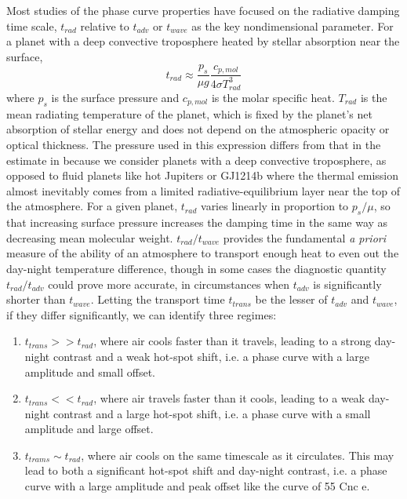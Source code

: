 Most studies of the phase curve properties have focused on the radiative damping time scale, $t_{rad}$ relative to $t_{adv}$ or $t_{wave}$ as the key nondimensional parameter.
For a planet with a deep convective troposphere heated by stellar absorption near the surface,
\begin{equation}
t_{rad} \approx \frac{p_{s}}{\mu g}  \frac{c_{p,mol}}{4 \sigma T_{rad}^3}
\end{equation}
where $p_s$ is the surface pressure and $c_{p,mol}$ is the molar specific heat.  $T_{rad}$ is the mean radiating temperature of the planet, which is fixed by the planet's net absorption of stellar energy and does not depend on the atmospheric opacity or optical thickness. The pressure used in this expression differs from that in the estimate in \citet{zhang2016effects} because we consider planets with a deep convective troposphere, as opposed to fluid planets like hot Jupiters or GJ1214b where the thermal emission almost inevitably comes from a limited radiative-equilibrium layer near the top of the atmosphere. For a given planet, $t_{rad}$ varies linearly in proportion to $p_s/\mu$, so that increasing surface pressure increases the damping time in the same way as decreasing mean molecular weight. $t_{rad}/t_{wave}$ provides the fundamental {\it a priori} measure of the ability of an atmosphere to transport enough heat to even out the day-night temperature difference, though in some cases the diagnostic quantity $t_{rad}/t_{adv}$ could prove more accurate, in circumstances when $t_{adv}$ is significantly shorter than $t_{wave}$. Letting the transport time $t_{trans}$ be the lesser of $t_{adv}$ and $t_{wave}$, if they differ significantly, we can identify three regimes:
\begin{enumerate}
  \item $t_{trans} >> t_{rad}$, where air cools faster than it travels, leading to a strong day-night contrast and a weak hot-spot shift, i.e. a phase curve with a large amplitude and small offset.
  \item $t_{trans} << t_{rad}$, where air travels faster than it cools, leading to a weak day-night contrast and a large hot-spot shift, i.e. a phase curve with a small amplitude and large offset.
  \item $t_{trams} \sim t_{rad}$, where air cools on the same timescale as it circulates. This may lead to both a significant hot-spot shift and day-night contrast, i.e. a phase curve with a large amplitude and peak offset like the curve of 55 Cnc e.
\end{enumerate}


